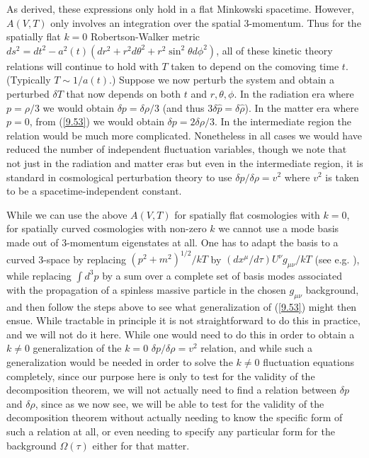 As derived, these expressions only hold in a flat  Minkowski spacetime. However, $A(V,T)$ only involves  an integration over the spatial 3-momentum. Thus for the spatially flat $k=0$ Robertson-Walker metric $ds^2=dt^2-a^2(t)(dr^2+r^2d\theta^2+r^2\sin^2\theta d\phi^2)$, all of these kinetic theory relations will continue to hold with $T$ taken to depend on the comoving time $t$. (Typically $T\sim 1/a(t)$.) Suppose we now perturb the system and obtain a perturbed $\delta T$ that now depends on both $t$ and $r,\theta,\phi$. In the radiation era where $p=\rho/3$ we would obtain $\delta p =\delta \rho/3$ (and thus $3\delta\hat{p}=\delta\hat{\rho}$). In the matter era where $p=0$, from (\ref{9.53}) we would obtain $\delta p=2\delta \rho/3$. In the intermediate region the relation would be much more complicated. Nonetheless in all cases we would have reduced the number of independent fluctuation variables, though we note that not just in the radiation and matter eras but even in the intermediate region, it is standard in cosmological perturbation theory to use $\delta p/\delta \rho=v^2$ where $v^2$ is taken to be a spacetime-independent constant.

While we can use the above $A(V,T)$ for spatially flat cosmologies with $k=0$, for spatially curved cosmologies with non-zero $k$ we cannot use a mode basis made out of 3-momentum eigenstates at all. One has to adapt the basis to a curved 3-space by replacing
$(p^2+m^2)^{1/2}/kT$ by $(dx^{\mu}/d\tau)U^{\nu}g_{\mu\nu}/kT$ (see e.g. \cite{mannheim_2006}), while replacing
$\int d^3p$ by a sum over a complete set of basis modes associated with
the propagation of a spinless massive particle in the chosen
$g_{\mu\nu}$ background, and then follow the steps above to see what
generalization of (\ref{9.53}) might then ensue. While tractable in principle it is not straightforward to do this in practice, and we will not do it here. While one would need to do this in order to obtain a $k\neq 0$ generalization of the $k=0$  $\delta p/\delta \rho=v^2$ relation, and while such a generalization would be needed in order to solve the $k\neq 0$ fluctuation equations completely, since our purpose here is only to test for the validity of the decomposition theorem, we will not actually need to find a relation between $\delta p$ and $\delta \rho$, since as we now see, we will be able to test for the validity of the decomposition theorem without actually needing to know the specific form of such a relation at all, or even needing to specify any particular form for the background $\Omega(\tau)$ either for that matter.
